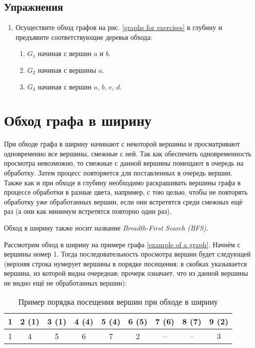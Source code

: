 \subsection{Упражнения}

\begin{enumerate}
	\item Осуществите обход графов на рис. \ref{graphs for exercises} в глубину и предъявите соответствующие деревья обхода:
	\begin{enumerate}
		\item $G_1$ начиная с вершин $a$ и $b$.
		\item $G_2$ начиная с вершины $a$.
		\item $G_3$ начиная с вершин $a$, $b$, $e$, $d$.
	\end{enumerate}
\end{enumerate}

\section{Обход графа в ширину}

При обходе графа в ширину начинают с некоторой вершины и просматривают 
одновременно все вершины, смежные с ней. Так как обеспечить одновременность 
просмотра невозможно, то смежные с данной вершины помещают в очередь на 
обработку. Затем процесс повторяется для поставленных в очередь вершин.
Также как и при обходе в глубину необходимо раскрашивать вершины графа в 
процессе обработки в разные цвета, например, с тою целью, чтобы не повторять 
обработку уже обработанных вершин, если они встретятся среди смежных ещё раз (а 
они как минимум встретятся повторно один раз).

Обход в ширину также носит название \emph{Breadth-First Search (BFS)}.

Рассмотрим обход в ширину на примере графа \ref{example of a graph}. Начнём с 
вершины номер 1. Тогда последовательность просмотра вершин будет следующей 
(верхняя строка нумерует вершины в порядке посещения; в скобках указывается 
вершина, из которой видна очередная; прочерк означает, что из данной вершины не 
видно ещё не обработанных вершин):

\begin{table}[h]
	\center
	\begin{tabular}{|c|c|c|c|c|c|c|c|c|}
		\hline
		1 & 2 (1) & 3 (1) & 4 (4) & 5 (4) & 6 (5) & 7 (6) & 8 (7) & 9 (2)\\
		\hline
		1 & 4 & 5 & 6 & 7 & 2 & – & – & 3\\
		\hline
	\end{tabular}
	\caption{Пример порядка посещения вершин при обходе в ширину}
\end{table}

